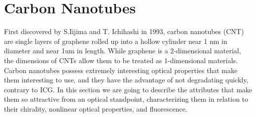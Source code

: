 \chapter{Carbon Nanotubes}
First discovered by S.Iijima and T. Ichihashi in 1993, carbon nanotubes (CNT) are single layers of graphene rolled up into a hollow cylinder near 1 nm in diameter and near 1um in length. While graphene is a 2-dimensional material, the dimensions of CNTs allow them to be treated as 1-dimensional materials.
Carbon nanotubes possess extremely interesting optical properties that make them interesting to use, and they have the advantage of not degradating quickly, contrary to ICG.
In this section we are going to describe the attributes that make them so attractive from an optical standpoint, characterizing them in relation to their chirality, nonlinear optical properties, and fluorescence.

